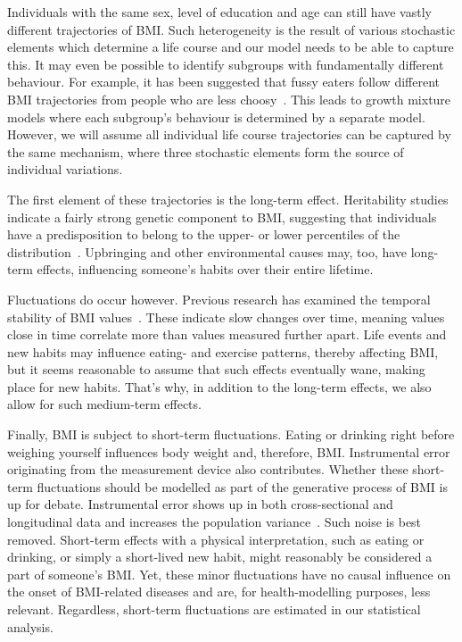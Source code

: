 \documentclass{imammb}
\numberwithin{equation}{section}
\begin{document}
Individuals with the same sex, level of education and age can still have vastly different trajectories of BMI. Such heterogeneity is the result of various stochastic elements which determine a life course and our model needs to be able to capture this. It may even be possible to identify subgroups with fundamentally different behaviour. For example, it has been suggested that fussy eaters follow different BMI trajectories from people who are less choosy~\citep{Herle2020}. This leads to growth mixture models where each subgroup's behaviour is determined by a separate model. However, we will assume all individual life course trajectories can be captured by the same mechanism, where three stochastic elements form the source of individual variations.

The first element of these trajectories is the long-term effect. Heritability studies indicate a fairly strong genetic component to BMI, suggesting that individuals have a predisposition to belong to the upper- or lower percentiles of the distribution~\citep{Mathias2003, Goode2007, Ordonana2007}. Upbringing and other environmental causes may, too, have long-term effects, influencing someone's habits over their entire lifetime.

Fluctuations do occur however. Previous research has examined the temporal stability of BMI values~\citep{Wilsgaard2001, Ulmer2003, Juhola2011, Bayer2011}. These indicate slow changes over time, meaning values close in time correlate more than values measured further apart. Life events and new habits may influence eating- and exercise patterns, thereby affecting BMI, but it seems reasonable to assume that such effects eventually wane, making place for new habits. That's why, in addition to the long-term effects, we also allow for such medium-term effects.

Finally, BMI is subject to short-term fluctuations. Eating or drinking right before weighing yourself influences body weight and, therefore, BMI. Instrumental error originating from the measurement device also contributes. Whether these short-term fluctuations should be modelled as part of the generative process of BMI is up for debate. Instrumental error shows up in both cross-sectional and longitudinal data and increases the population variance~\citep{Biehl2013}. Such noise is best removed. Short-term effects with a physical interpretation, such as eating or drinking, or simply a short-lived new habit, might reasonably be considered a part of someone's BMI. Yet, these minor fluctuations have no causal influence on the onset of BMI-related diseases and are, for health-modelling purposes, less relevant. Regardless, short-term fluctuations are estimated in our statistical analysis.
\end{document}
